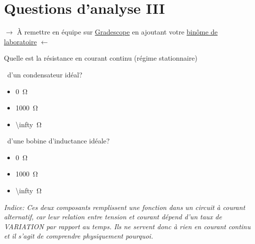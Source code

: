 \documentclass[canadien,12pt,oneside,letterpaper]{article}
\begin{document}
\section{Questions d'analyse III} \label{sec:grade}
\vspace{-0.5cm}
\noindent$\rightarrow$ À remettre en équipe sur \href{https://www.gradescope.com/}{Gradescope} en ajoutant votre \href{https://help.gradescope.com/article/m5qz2xsnjy-student-add-group-members}{binôme de laboratoire} $\leftarrow$
\vspace{-0.4cm}
\begin{gradescope}
    \item Quelle est la résistance en courant continu (régime stationnaire)
        \begin{gradescope}[topsep=-1pt]
        \item $\,$ d'un condensateur idéal?
            \begin{itemize}[label=$\blacktriangleright$,topsep=0pt,itemsep=-1ex]
            \item \qty{0}{\ohm}
            \item \qty{1000}{\ohm}
            \item \qty[parse-numbers = false]{\infty}{\ohm}
            \end{itemize}
        \item $\,$ d'une bobine d'inductance idéale?
            \begin{itemize}[label=$\blacktriangleright$, topsep=0pt,itemsep=-1ex]
            \item \qty{0}{\ohm}
            \item \qty{1000}{\ohm}
            \item \qty[parse-numbers = false]{\infty}{\ohm}
            \end{itemize}
        \end{gradescope}
\end{gradescope}
\vspace{-0.5ex}
\textit{\footnotesize Indice: Ces deux composants remplissent une fonction dans un circuit à courant alternatif, car leur relation entre tension et courant dépend d'un taux de VARIATION par rapport au temps. Ils ne servent donc à rien en courant continu et il s'agit de comprendre physiquement pourquoi.}
\end{document}
